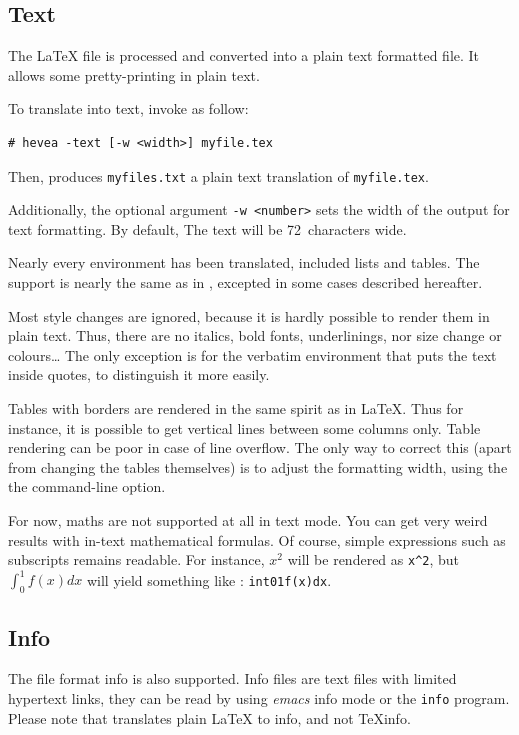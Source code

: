 \subsection{Text}
The \LaTeX{} file is processed and converted into a plain text
formatted file. It allows some pretty-printing in plain text.

To translate into text, invoke \hevea{} as follow:
\begin{verbatim}
# hevea -text [-w <width>] myfile.tex
\end{verbatim}
Then, \hevea{} produces \texttt{myfiles.txt} a plain text translation
of \texttt{myfile.tex}.

Additionally, the optional argument \texttt{-w <number>} sets the
width of the output for text formatting. By default, The text will be
72~characters wide.

Nearly every environment has been translated, included lists and tables.
The support is nearly the same as in \html, excepted in some cases
described hereafter.

Most style changes are ignored, because it is hardly
possible to render them in plain text. Thus, there are no italics,
bold fonts, underlinings, nor size change or colours\ldots{}
The only exception is for the verbatim environment
that puts the text inside quotes, to distinguish it more easily.

Tables with borders are rendered in the same spirit as in \LaTeX{}.
Thus for instance, it is possible to get vertical lines between some
columns only.
Table rendering can be poor in case of line overflow.
The only way to correct this (apart from changing the tables
themselves) is to adjust the formatting width, using the
the  command-line option.

For now, maths are not supported at all in text mode. You can get very weird
results with in-text mathematical formulas.
Of course, simple expressions such as subscripts remains readable.
For instance, $x^2$ will be rendered as \verb+x^2+, but $\int_0^1f(x)dx$ will
yield something like : \verb+int01f(x)dx+.


\subsection{Info}
The file format info is also supported.
Info files are text files with limited hypertext links, they
can be read by using \emph{emacs} info mode or the
\texttt{info} program.
Please note that \hevea{} translates plain \LaTeX{} to info, and not
TeXinfo.

